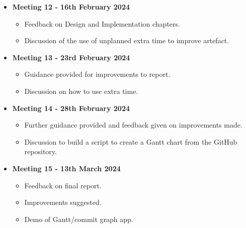 \begin{itemize}
\begin{itemize}
    \end{itemize}
    \item \textbf{Meeting 12 - 16th February 2024}
    \begin{itemize}
        \item Feedback on Design and Implementation chapters.
        \item Discussion of the use of unplanned extra time to improve artefact.
    \end{itemize}
    \item \textbf{Meeting 13 - 23rd February 2024}
    \begin{itemize}
        \item Guidance provided for improvements to report.
        \item Discussion on how to use extra time.
    \end{itemize}
    \item \textbf{Meeting 14 - 28th February 2024}
    \begin{itemize}
        \item Further guidance provided and feedback given on improvements made.
        \item Discussion to build a script to create a Gantt chart from the GitHub repository.
    \end{itemize}
    \item \textbf{Meeting 15 - 13th March 2024}
    \begin{itemize}
        \item Feedback on final report.
        \item Improvements suggested.
        \item Demo of Gantt/commit graph app.
    \end{itemize}
\end{itemize}